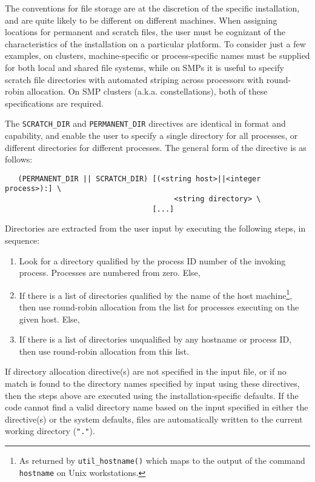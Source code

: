 The conventions for file storage are at the discretion of the specific 
installation, and are quite likely to be different on different machines.  
When assigning locations for permanent and
scratch files,
the user must be cognizant of the characteristics of the installation
on a particular platform.
To consider just a few examples, on
clusters, machine-specific or process-specific
names must be supplied for both local and shared file
systems, while on SMPs it is useful to specify scratch file directories
with automated striping across processors with round-robin allocation.
On SMP clusters (a.k.a. constellations), both of these specifications
are required.   

The \verb+SCRATCH_DIR+ and \verb+PERMANENT_DIR+ directives are
identical in format and capability, and enable the user to specify a
single directory for all processes, or different directories for
different processes.  The general form of the directive is as follows:

\begin{verbatim}
   (PERMANENT_DIR || SCRATCH_DIR) [(<string host>||<integer process>):] \
                                       <string directory> \ 
                                  [...]
\end{verbatim}

Directories are extracted from the user input by executing the
following steps, in sequence:
\begin{enumerate}
\item Look for a directory qualified by the process ID number of the
  invoking process.  Processes are numbered from zero.  Else,
\item If there is a list of directories qualified by the name of the
  host machine\footnote{As returned by {\tt util\_hostname()} which
    maps to the output of the command {\tt hostname} on Unix
    workstations.}, then use round-robin allocation from the list for
  processes executing on the given host.  Else, 
\item If there is a list of directories unqualified by any hostname
  or process ID, then use round-robin allocation from this list.
\end{enumerate}
If directory allocation directive(s) are not specified in the input
file, or if no match is found to the directory names specified by
input using these directives, then the  steps above are executed using
the installation-specific defaults.  If the code cannot find a valid
directory name based on the input specified in either the directive(s)
or the system defaults, files are automatically written to the current
working directory (\verb+"."+).

